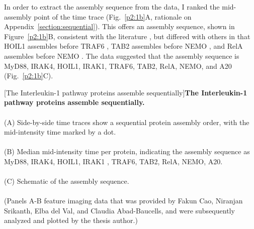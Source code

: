 In order to extract the assembly sequence from the data, I ranked the mid-assembly point of the time trace (Fig.~\ref{p2:1b}A, rationale on Appendix~\ref{section:sequential}). This offers an assembly sequence, shown in Figure~\ref{p2:1b}B, consistent with the literature \autocite{Lin_2010}\autocite{Deliz-Aguirre_2021}\autocite{Ye_2002}\autocite{Zarrin_2021}\autocite{Zinatizadeh_2021}, but differed with others in that HOIL1 assembles before TRAF6 \autocite{Cohen_2014}, TAB2 assembles before NEMO \autocite{Cohen_2020}, and RelA assembles before NEMO \autocite{Cohen_2020}\autocite{Zarrin_2021}\autocite{Zinatizadeh_2021}. The data suggested that the assembly sequence is MyD88, IRAK4, HOIL1, IRAK1, TRAF6, TAB2, RelA, NEMO, and A20 (Fig.~\ref{p2:1b}C).


\begin{centering}
\captionsetup{parbox=none}
[The Interleukin-1 pathway proteins assemble sequentially]{\textbf{The Interleukin-1 pathway proteins assemble sequentially.}
\\
\\
(A) Side-by-side time traces show a sequential protein assembly order, with the mid-intensity time marked by a dot.
\\
\\
(B) Median mid-intensity time per protein, indicating the assembly sequence as MyD88, IRAK4, HOIL1, IRAK1 , TRAF6, TAB2, RelA, NEMO, A20.
\\
\\
(C) Schematic of the assembly sequence.
\\
\\
(Panels A-B feature imaging data that was provided by Fakun Cao, Niranjan Srikanth, Elba del Val, and Claudia Abad-Baucells, and were subsequently analyzed and plotted by the thesis author.)}
\label{p2:1b}
\end{centering}


